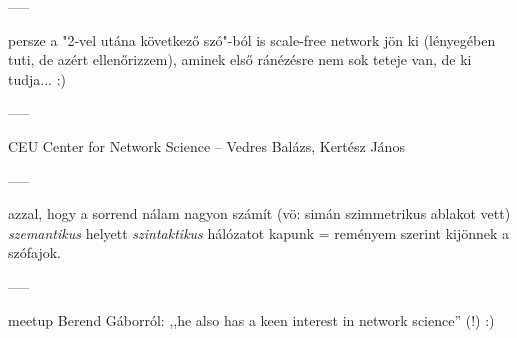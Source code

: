 \documentclass{llncs}
\begin{document}
-----

persze a "2-vel utána következő szó"-ból is scale-free network jön ki
(lényegében tuti, de azért ellenőrizzem),
aminek első ránézésre nem sok teteje van, de ki tudja... :)

-----

CEU Center for Network Science -- Vedres Balázs, Kertész János

-----

azzal, hogy a sorrend nálam nagyon számít
(vö: \cite{kovacs2012magyar} simán szimmetrikus ablakot vett)
\emph{szemantikus} helyett \emph{szintaktikus} hálózatot kapunk
= reményem szerint kijönnek a szófajok.

-----

meetup Berend Gáborról:
,,he also has a keen interest in network science'' (!) :)





%


\end{document}
